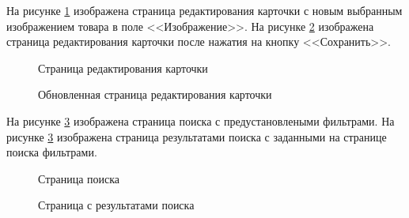 На рисунке \ref{test-front5:image} изображена страница редактирования карточки с новым выбранным изображением товара в поле <<Изображение>>. На рисунке \ref{test-front6:image} изображена страница редактирования карточки после нажатия на кнопку <<Сохранить>>.

\newpage %
\begin{figure}[H] %
\caption{Страница редактирования карточки}
\label{test-front5:image}
\end{figure}

\newpage %
\begin{figure}[H] %
\caption{Обновленная страница редактирования карточки}
\label{test-front6:image}
\end{figure}

На рисунке \ref{test-front7:image} изображена страница поиска с предустановлеными фильтрами. На рисунке \ref{test-front7:image} изображена страница результатами поиска с заданными на странице поиска фильтрами.

\begin{figure}[H] %
\caption{Страница поиска}
\label{test-front7:image}
\end{figure}

\begin{figure}[H] %
\caption{Страница с результатами поиска}
\label{test-front8:image}
\end{figure}

